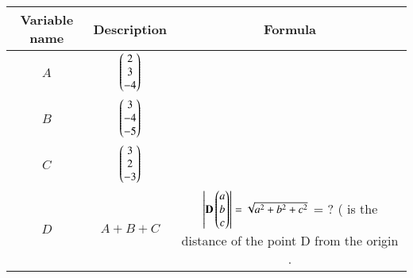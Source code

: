 \begin{tabular}[12pt]{|c|c|c|}
    \hline
    \textbf{Variable name} & \textbf{Description} & \textbf{Formula}\\ 
    \hline
		$A$ & $\begin{pmatrix}2 \\ 3 \\ -4\end{pmatrix}$ &  \\
    \hline 
		$B$ & $\begin{pmatrix}3 \\ -4 \\ -5\end{pmatrix}$ & \\
    \hline
		$C$ & $\begin{pmatrix}3 \\ 2 \\ -3\end{pmatrix}$ &   \\
    \hline   
	$D$ & $A+B+C$ &  $\left\vert\mathbf{D}\begin{pmatrix}a\\b\\c\end{pmatrix}\right\vert=\sqrt{a^2+b^2+c^2}$ = ? (\since \abs{D} is the distance of the point D from the origin . \\
	\hline
\end{tabular}

